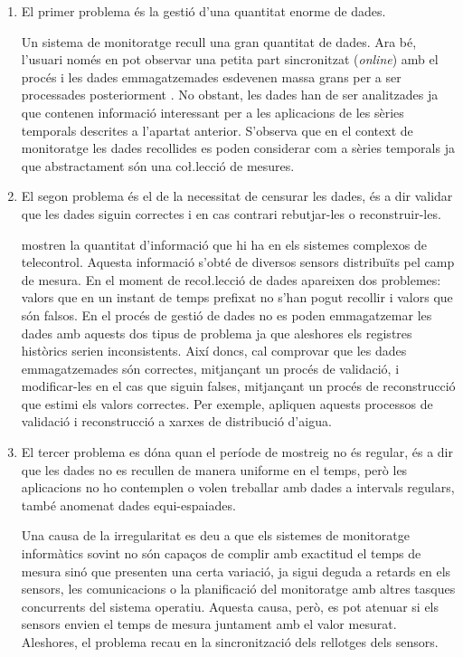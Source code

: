 \begin{enumerate}
\item El primer problema és la gestió d'una quantitat enorme de dades. 

Un sistema de monitoratge recull una gran quantitat de dades. Ara bé, l'usuari només en pot observar una petita part sincronitzat (\emph{online}) amb el procés i les dades emmagatzemades esdevenen massa grans per a ser processades posteriorment \parencite{keogh97}. No obstant, les dades han de ser analitzades ja que contenen informació interessant per a les aplicacions de les sèries temporals descrites a l'apartat anterior. S'observa que en el context de monitoratge les dades recollides es poden considerar com a sèries temporals ja que abstractament són una co\l.lecció de mesures.


\item El segon problema és el de la necessitat de censurar les dades, és a dir validar que les dades siguin correctes i en cas contrari rebutjar-les o reconstruir-les. 

\textcite{quevedo10} mostren la quantitat d'informació que hi ha en els sistemes complexos de telecontrol. Aquesta informació s'obté de diversos sensors distribuïts pel camp de mesura.
En el moment de reco\l.lecció de dades apareixen dos problemes: valors que en un instant de temps prefixat no s'han pogut recollir i valors que són falsos. En el procés de gestió de dades no es poden emmagatzemar les dades amb aquests dos tipus de problema ja que aleshores els registres històrics serien inconsistents. 
Així doncs, cal comprovar que les dades emmagatzemades són correctes, mitjançant un procés de validació, i modificar-les en el cas que siguin falses, mitjançant un procés de reconstrucció que estimi els valors correctes. Per exemple, \citeauthor{quevedo10} apliquen aquests processos de validació i reconstrucció a xarxes de distribució d'aigua.


\item El tercer problema es dóna quan el període de mostreig no és regular, és a dir que les dades no es recullen de manera uniforme en el temps, però les aplicacions no ho contemplen o volen treballar amb dades a intervals regulars, també anomenat dades equi-espaiades.

Una causa de la irregularitat es deu a que els sistemes de monitoratge informàtics sovint no són capaços de complir amb exactitud el temps de mesura sinó que presenten una certa variació, ja sigui deguda a retards en els sensors, les comunicacions o la planificació del monitoratge amb altres tasques concurrents del sistema operatiu. Aquesta causa, però, es pot atenuar si els sensors envien el temps de mesura juntament amb el valor mesurat. Aleshores, el problema recau en la sincronització dels rellotges dels sensors.


\end{enumerate}

